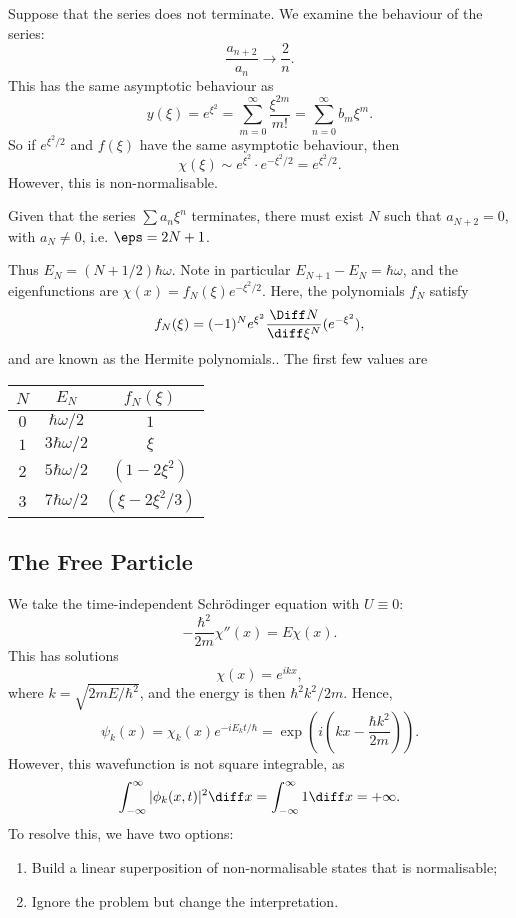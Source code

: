 \documentclass[12pt]{article}
\begin{document}
\begin{proofbox}
	Suppose that the series does not terminate. We examine the behaviour of the series:
	\[
	\frac{a_{n+2}}{a_n} \to \frac{2}{n}
	.\]
	This has the same asymptotic behaviour as
	\[
		y(\xi) = e^{\xi ^2} = \sum_{m = 0}^{\infty} \frac{\xi^{2m}}{m!} = \sum_{n = 0}^{\infty} b_m \xi^{m}
	.\]
	So if $e^{\xi^2/2}$ and $f(\xi)$ have the same asymptotic behaviour, then
	\[
		\chi(\xi) \sim e^{\xi^2} \cdot e^{- \xi^2/2} = e^{\xi^2/2}
	.\]
	However, this is non-normalisable.
\end{proofbox}

Given that the series $\sum a_n \xi^{n}$ terminates, there must exist $N$ such that $a_{N + 2} = 0$, with $a_N \neq 0$, i.e. $\eps = 2N+1$.

Thus $E_N = (N+1/2)\hbar \omega$. Note in particular $E_{N+1} - E_N = \hbar \omega$, and the eigenfunctions are $\chi(x) = f_N(\xi) e^{-\xi^2/2}$. Here, the polynomials $f_N$ satisfy
\[
	f_N(\xi) = (-1)^{N} e^{\xi^2} \frac{\Diff N}{\diff \xi^{N}}(e^{-\xi^2})
,\]
and are known as the Hermite polynomials.. The first few values are

\begin{center}
\begin{tabular}{c|c|c}
	$N$ & $E_N$ & $f_N(\xi)$ \\
	\hline
	$0$ & $\hbar \omega/2$ & $1$ \\
	$1$ & $3\hbar\omega/2$ & $\xi$ \\
	$2$ & $5\hbar\omega/2$ & $(1 - 2\xi^2)$ \\
	$3$ & $7\hbar\omega/2$ & $(\xi - 2\xi^2/3)$ \\
\end{tabular}
\end{center}

\subsection{The Free Particle}%
\label{sub:the_free_particle}

We take the time-independent Schr\"{o}dinger equation with $U \equiv 0$:
\[
	-\frac{\hbar^2}{2m} \chi''(x) = E\chi(x)
.\]
This has solutions
\[
	\chi(x) = e^{ikx}
,\]
where $k = \sqrt{2mE/\hbar^2}$, and the energy is then $\hbar^2k^2/2m$. Hence,
\[
	\psi_k(x) = \chi_k(x) e^{-iE_kt/\hbar} = \exp \left( i \left(kx - \frac{\hbar k^2}{2m} \right) \right)
.\]
However, this wavefunction is not square integrable, as
\[
	\int_{-\infty}^{\infty} |\phi_k(x, t)|^2\diff x = \int_{-\infty}^{\infty}1\diff x = +\infty
.\]
To resolve this, we have two options:
\begin{enumerate}[1.]
	\item Build a linear superposition of non-normalisable states that is normalisable;
	\item Ignore the problem but change the interpretation.
\end{enumerate}
\end{document}
